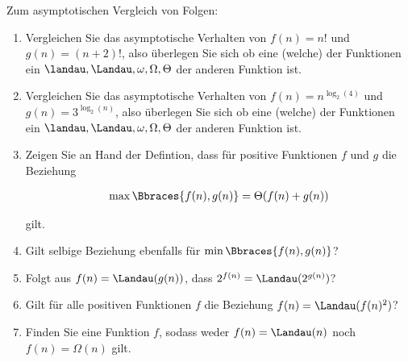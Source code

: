 
\begin{exercise}

Zum asymptotischen Vergleich von Folgen:

\begin{enumerate}[label = (\alph*)]

  \item Vergleichen Sie das asymptotische Verhalten von $f(n) = n!$ und $g(n) = (n + 2)!$, also überlegen Sie sich ob eine (welche) der Funktionen ein $\landau, \Landau, \omega, \Omega, \Theta$ der anderen Funktion ist.

  \item Vergleichen Sie das asymptotische Verhalten von $f(n) = n^{\log_2(4)}$ und $g(n) = 3^{\log_2(n)}$, also überlegen Sie sich ob eine (welche) der Funktionen ein $\landau, \Landau, \omega, \Omega, \Theta$ der anderen Funktion ist.

  \item Zeigen Sie an Hand der Defintion, dass für positive Funktionen $f$ und $g$ die Beziehung

  \begin{align*}
    \max \Bbraces{f(n), g(n)} = \Theta(f(n) + g(n))
  \end{align*}

  gilt.

  \item Gilt selbige Beziehung ebenfalls für $\min \Bbraces{f(n), g(n)}$?

  \item Folgt aus $f(n) = \Landau(g(n))$, dass $2^{f(n)} = \Landau(2^{g(n)})$?

  \item Gilt für alle positiven Funktionen $f$ die Beziehung $f(n) = \Landau(f(n)^2)$?

  \item Finden Sie eine Funktion $f$, sodass weder $f(n) = \Landau(n)$ noch $f(n) = \Omega(n)$ gilt.

\end{enumerate}

\end{exercise}


